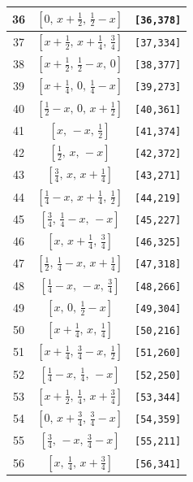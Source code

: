 \documentclass[fleqn,8pt]{jsarticle}
\begin{document}
\begin{longtable}{ccc}
36 & $\left[ 0,\, x + \frac{1}{2},\, \frac{1}{2} - x \right]$ & {\tt [36,378]} \\ \hline
37 & $\left[ x + \frac{1}{2},\, x + \frac{1}{4},\, \frac{3}{4} \right]$ & {\tt [37,334]} \\ \hline
38 & $\left[ x + \frac{1}{2},\, \frac{1}{2} - x,\, 0 \right]$ & {\tt [38,377]} \\ \hline
39 & $\left[ x + \frac{1}{4},\, 0,\, \frac{1}{4} - x \right]$ & {\tt [39,273]} \\ \hline
40 & $\left[ \frac{1}{2} - x,\, 0,\, x + \frac{1}{2} \right]$ & {\tt [40,361]} \\ \hline
41 & $\left[ x,\, - x,\, \frac{1}{2} \right]$ & {\tt [41,374]} \\ \hline
42 & $\left[ \frac{1}{2},\, x,\, - x \right]$ & {\tt [42,372]} \\ \hline
43 & $\left[ \frac{3}{4},\, x,\, x + \frac{1}{4} \right]$ & {\tt [43,271]} \\ \hline
44 & $\left[ \frac{1}{4} - x,\, x + \frac{1}{4},\, \frac{1}{2} \right]$ & {\tt [44,219]} \\ \hline
45 & $\left[ \frac{3}{4},\, \frac{1}{4} - x,\, - x \right]$ & {\tt [45,227]} \\ \hline
46 & $\left[ x,\, x + \frac{1}{4},\, \frac{3}{4} \right]$ & {\tt [46,325]} \\ \hline
47 & $\left[ \frac{1}{2},\, \frac{1}{4} - x,\, x + \frac{1}{4} \right]$ & {\tt [47,318]} \\ \hline
48 & $\left[ \frac{1}{4} - x,\, - x,\, \frac{3}{4} \right]$ & {\tt [48,266]} \\ \hline
49 & $\left[ x,\, 0,\, \frac{1}{2} - x \right]$ & {\tt [49,304]} \\ \hline
50 & $\left[ x + \frac{1}{4},\, x,\, \frac{1}{4} \right]$ & {\tt [50,216]} \\ \hline
51 & $\left[ x + \frac{1}{4},\, \frac{3}{4} - x,\, \frac{1}{2} \right]$ & {\tt [51,260]} \\ \hline
52 & $\left[ \frac{1}{4} - x,\, \frac{1}{4},\, - x \right]$ & {\tt [52,250]} \\ \hline
53 & $\left[ x + \frac{1}{2},\, \frac{1}{4},\, x + \frac{3}{4} \right]$ & {\tt [53,344]} \\ \hline
54 & $\left[ 0,\, x + \frac{3}{4},\, \frac{3}{4} - x \right]$ & {\tt [54,359]} \\ \hline
55 & $\left[ \frac{3}{4},\, - x,\, \frac{3}{4} - x \right]$ & {\tt [55,211]} \\ \hline
56 & $\left[ x,\, \frac{1}{4},\, x + \frac{3}{4} \right]$ & {\tt [56,341]} \\ \hline

\end{longtable}
\end{document}
